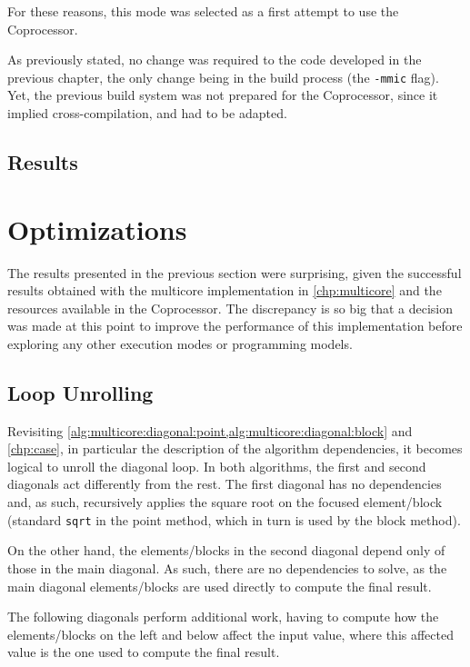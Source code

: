 \documentclass[../thesis]{subfiles}
\begin{document}
	For these reasons, this mode was selected as a first attempt to use the \intel\xeonphi Coprocessor.

	As previously stated, no change was required to the code developed in the previous chapter, the only change being in the build process (the \texttt{-mmic} flag). Yet, the previous build system was not prepared for the \intel\xeonphi Coprocessor, since it implied cross-compilation, and had to be adapted.

	\subsection{Results}

	\section{Optimizations}
		The results presented in the previous section were surprising, given the successful results obtained with the multicore implementation in \cref{chp:multicore} and the resources available in the \intel\xeonphi Coprocessor. The discrepancy is so big that a decision was made at this point to improve the performance of this implementation before exploring any other execution modes or programming models.

		\subsection{Loop Unrolling}
		Revisiting \cref{alg:multicore:diagonal:point,alg:multicore:diagonal:block} and \cref{chp:case}, in particular the description of the algorithm dependencies, it becomes logical to unroll the diagonal loop. In both algorithms, the first and second diagonals act differently from the rest. The first diagonal has no dependencies and, as such, recursively applies the square root on the focused element/block (standard \texttt{sqrt} in the point method, which in turn is used by the block method).

		On the other hand, the elements/blocks in the second diagonal depend only of those in the main diagonal. As such, there are no dependencies to solve, as the main diagonal elements/blocks are used directly to compute the final result.

		The following diagonals perform additional work, having to compute how the elements/blocks on the left and below affect the input value, where this affected value is the one used to compute the final result.
\end{document}
